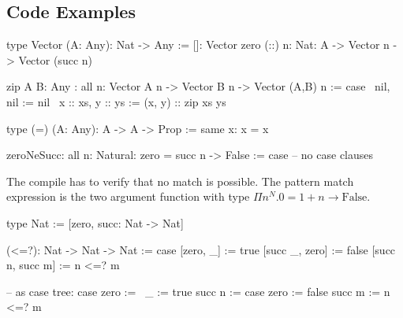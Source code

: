 \subsection{Code Examples}




\begin{alba}
    type Vector (A: Any): Nat -> Any :=
        []:  Vector zero
        (::) {n: Nat}: A -> Vector n -> Vector (succ n)

    zip {A B: Any}
    : all {n}: Vector A n -> Vector B n -> Vector (A,B) n
    := case
        \ nil,     nil     := nil
        \ x :: xs, y :: ys := (x, y) :: zip xs ys
\end{alba}




\begin{alba}
    type (=) (A: Any): A -> A -> Prop :=
        same {x}: x = x

    zeroNeSucc: all {n: Natural}: zero = succ n -> False :=
        case
            -- no case clauses
\end{alba}

The compile has to verify that no match is possible. The pattern match
expression is the two argument function with type $\Pi n^N. 0 = 1 + n \to
\text{False}$.



\begin{alba}
    type Nat := [zero, succ: Nat -> Nat]

    (<=?): Nat -> Nat -> Nat := case
        [zero, _]        :=  true
        [succ _, zero]   :=  false
        [succ n, succ m] :=  n <=? m

    -- as case tree:
    case
        zero           :=   \ _ := true
        succ n :=
            case
                zero   :=   false
                succ m :=   n <=? m
\end{alba}
